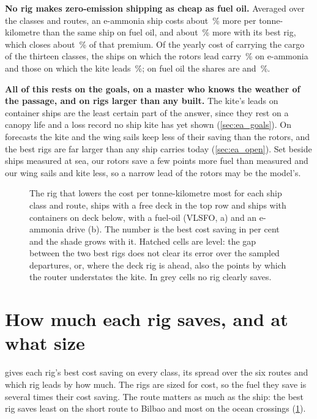 \documentclass[10pt,a4paper]{article}
\begin{document}
\textbf{No rig makes zero-emission shipping as cheap as fuel oil.} Averaged over the classes and routes, an e-ammonia ship costs about \NumPremiumNoRig\,\% more per tonne-kilometre than the same ship on fuel oil, and about \NumPremiumBestRig\,\% more with its best rig, which closes about \NumPremiumClosed\,\% of that premium. Of the yearly cost of carrying the cargo of the thirteen classes, the ships on which the rotors lead carry \NumFleetShareAmmoniaRotors\,\% on e-ammonia and those on which the kite leads \NumFleetShareAmmoniaKite\,\%; on fuel oil the shares are \NumFleetShareOilRotors{} and \NumFleetShareOilKite\,\%.

\textbf{All of this rests on the goals, on a master who knows the weather of the passage, and on rigs larger than any built.} The kite's leads on container ships are the least certain part of the answer, since they rest on a canopy life and a loss record no ship kite has yet shown (\cref{sec:ea_goals}). On forecasts the kite and the wing sails keep less of their saving than the rotors, and the best rigs are far larger than any ship carries today (\cref{sec:ea_open}). Set beside ships measured at sea, our rotors save a few points more fuel than measured and our wing sails and kite less, so a narrow lead of the rotors may be the model's.

\begin{figure}[!htb]
\centering
{}
\caption{The rig that lowers the cost per tonne-kilometre most for each ship class and route, ships with a free deck in the top row and ships with containers on deck below, with a fuel-oil (VLSFO, a) and an e-ammonia drive (b). The number is the best cost saving in per cent and the shade grows with it. Hatched cells are level: the gap between the two best rigs does not clear its error over the sampled departures, or, where the deck rig is ahead, also the \NumKiteGapBias{} points by which the router understates the kite. In grey cells no rig clearly saves.}
\label{ea:winner_map}
\end{figure}

\section{How much each rig saves, and at what size}

 gives each rig's best cost saving on every class, its spread over the six routes and which rig leads by how much. The rigs are sized for cost, so the fuel they save is several times their cost saving. The route matters as much as the ship: the best rig saves least on the short route to Bilbao and most on the ocean crossings (\cref{ea:winner_map}).
\end{document}
